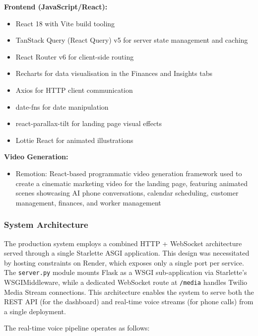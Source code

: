 \documentclass[conference]{IEEEtran}
\begin{document}
\textbf{Frontend (JavaScript/React):}
\begin{itemize}
\item React 18 with Vite build tooling
\item TanStack Query (React Query) v5 for server state management and caching
\item React Router v6 for client-side routing
\item Recharts for data visualisation in the Finances and Insights tabs
\item Axios for HTTP client communication
\item date-fns for date manipulation
\item react-parallax-tilt for landing page visual effects
\item Lottie React for animated illustrations
\end{itemize}

\textbf{Video Generation:}
\begin{itemize}
\item Remotion: React-based programmatic video generation framework used to create a cinematic marketing video for the landing page, featuring animated scenes showcasing AI phone conversations, calendar scheduling, customer management, finances, and worker management
\end{itemize}

\subsubsection{System Architecture}

The production system employs a combined HTTP + WebSocket architecture served through a single Starlette ASGI application. This design was necessitated by hosting constraints on Render, which exposes only a single port per service. The \texttt{server.py} module mounts Flask as a WSGI sub-application via Starlette's WSGIMiddleware, while a dedicated WebSocket route at \texttt{/media} handles Twilio Media Stream connections. This architecture enables the system to serve both the REST API (for the dashboard) and real-time voice streams (for phone calls) from a single deployment.

The real-time voice pipeline operates as follows:
\end{document}
